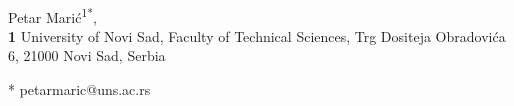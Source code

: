 \\
Petar Marić\textsuperscript{1*},
\\
\bigskip
\textbf{1} University of Novi Sad, Faculty of Technical Sciences, Trg Dositeja Obradovića 6, 21000 Novi Sad, Serbia
\\
\bigskip

* petarmaric@uns.ac.rs
